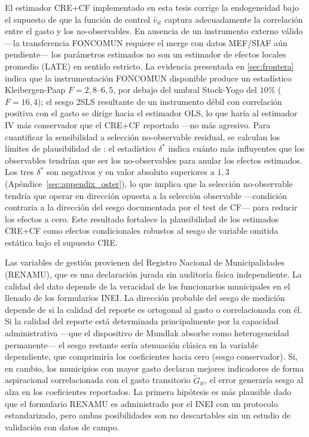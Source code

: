 El estimador CRE+CF implementado en esta tesis corrige la endogeneidad bajo el supuesto de que la función de control $\hat{v}_{it}$ captura adecuadamente la correlación entre el gasto y los no-observables. En ausencia de un instrumento externo válido ---la transferencia FONCOMUN requiere el merge con datos MEF/SIAF aún pendiente--- los parámetros estimados no son un estimador de efectos locales promedio (LATE) en sentido estricto. La evidencia presentada en \cref{sec:frontera} indica que la instrumentación FONCOMUN disponible produce un estadístico Kleibergen-Paap $F = 2{,}8$--$6{,}5$, por debajo del umbral Stock-Yogo del $10\%$ ($F = 16{,}4$); el sesgo 2SLS resultante de un instrumento débil con correlación positiva con el gasto se dirige hacia el estimador OLS, lo que haría al estimador IV más conservador que el CRE+CF reportado ---no más agresivo. Para cuantificar la sensibilidad a selección no-observable residual, se calculan los límites de plausibilidad de \citet{Oster2019}: el estadístico $\delta^*$ indica cuánto más influyentes que los observables tendrían que ser los no-observables para anular los efectos estimados. Los tres $\delta^*$ son negativos y en valor absoluto superiores a $1{,}3$ (Apéndice~\ref{sec:appendix_oster}), lo que implica que la selección no-observable tendría que operar en dirección opuesta a la selección observable ---condición contraria a la dirección del sesgo documentada por el test de CF--- para reducir los efectos a cero. Este resultado fortalece la plausibilidad de los estimados CRE+CF como efectos condicionales robustos al sesgo de variable omitida estática bajo el supuesto CRE.

Las variables de gestión provienen del Registro Nacional de Municipalidades (RENAMU), que es una declaración jurada sin auditoría física independiente. La calidad del dato depende de la veracidad de los funcionarios municipales en el llenado de los formularios INEI. La dirección probable del sesgo de medición depende de si la calidad del reporte es ortogonal al gasto o correlacionada con él. Si la calidad del reporte está determinada principalmente por la capacidad administrativa ---que el dispositivo de Mundlak absorbe como heterogeneidad permanente--- el sesgo restante sería atenuación clásica en la variable dependiente, que comprimiría los coeficientes hacia cero (sesgo conservador). Si, en cambio, los municipios con mayor gasto declaran mejores indicadores de forma aspiracional correlacionada con el gasto transitorio $\tilde{G}_{it}$, el error generaría sesgo al alza en los coeficientes reportados. La primera hipótesis es más plausible dado que el formulario RENAMU es administrado por el INEI con un protocolo estandarizado, pero ambas posibilidades son no descartables sin un estudio de validación con datos de campo.

